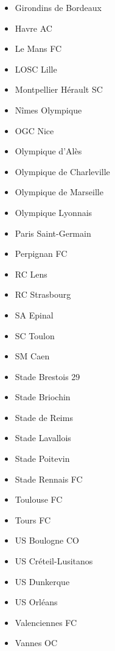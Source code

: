 \begin{multicols}{2}
\begin{itemize}
		\item Girondins de Bordeaux
		\item Havre AC
		\item Le Mans FC
		\item LOSC Lille
		\item Montpellier Hérault SC
		\item Nîmes Olympique
		\item OGC Nice
		\item Olympique d'Alès
		\item Olympique de Charleville
		\item Olympique de Marseille
		\item Olympique Lyonnais
		\item Paris Saint-Germain
		\item Perpignan FC
		\item RC Lens
		\item RC Strasbourg
		\item SA Epinal
		\item SC Toulon
		\item SM Caen
		\item Stade Brestois 29
		\item Stade Briochin
		\item Stade de Reims
		\item Stade Lavallois
		\item Stade Poitevin
		\item Stade Rennais FC
		\item Toulouse FC
		\item Tours FC
		\item US Boulogne CO
		\item US Créteil-Lusitanos
		\item US Dunkerque
		\item US Orléans
		\item Valenciennes FC
		\item Vannes OC
	\end{itemize}
\end{multicols}

